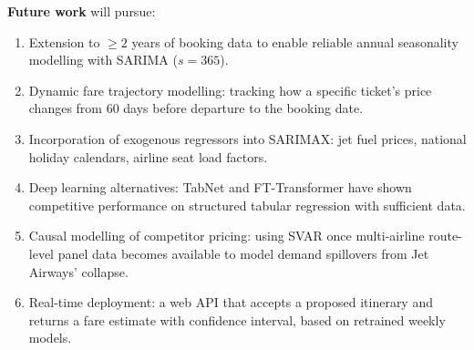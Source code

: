 \documentclass[12pt, a4paper]{article}
\begin{document}
\textbf{Future work} will pursue:
\begin{enumerate}
    \item Extension to $\geq 2$ years of booking data to enable reliable annual
    seasonality modelling with SARIMA ($s = 365$).
    \item Dynamic fare trajectory modelling: tracking how a specific ticket's
    price changes from 60 days before departure to the booking date.
    \item Incorporation of exogenous regressors into SARIMAX: jet fuel prices,
    national holiday calendars, airline seat load factors.
    \item Deep learning alternatives: TabNet and FT-Transformer have shown
    competitive performance on structured tabular regression with sufficient data.
    \item Causal modelling of competitor pricing: using SVAR once multi-airline
    route-level panel data becomes available to model demand spillovers from
    Jet Airways' collapse.
    \item Real-time deployment: a web API that accepts a proposed itinerary and
    returns a fare estimate with confidence interval, based on retrained weekly
    models.
\end{enumerate}
\end{document}
